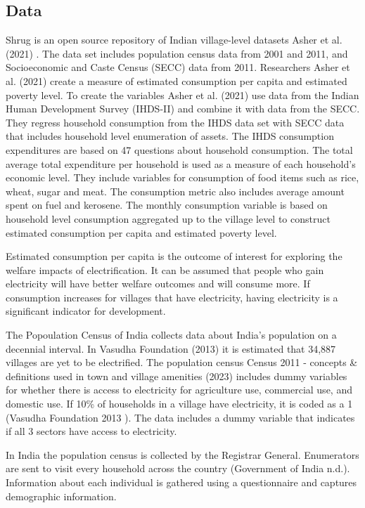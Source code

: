 \documentclass[
]{article}
\begin{document}
\hypertarget{data}{%
\subsection{Data}\label{data}}

Shrug is an open source repository of Indian village-level datasets
Asher et al. (2021) . The data set includes population census data from
2001 and 2011, and Socioeconomic and Caste Census (SECC) data from 2011.
Researchers Asher et al. (2021) create a measure of estimated
consumption per capita and estimated poverty level. To create the
variables Asher et al. (2021) use data from the Indian Human Development
Survey (IHDS-II) and combine it with data from the SECC. They regress
household consumption from the IHDS data set with SECC data that
includes household level enumeration of assets. The IHDS consumption
expenditures are based on 47 questions about household consumption. The
total average total expenditure per household is used as a measure of
each household's economic level. They include variables for consumption
of food items such as rice, wheat, sugar and meat. The consumption
metric also includes average amount spent on fuel and kerosene. The
monthly consumption variable is based on household level consumption
aggregated up to the village level to construct estimated consumption
per capita and estimated poverty level.

Estimated consumption per capita is the outcome of interest for
exploring the welfare impacts of electrification. It can be assumed that
people who gain electricity will have better welfare outcomes and will
consume more. If consumption increases for villages that have
electricity, having electricity is a significant indicator for
development.

The Popoulation Census of India collects data about India's population
on a decennial interval. In Vasudha Foundation (2013) it is estimated
that 34,887 villages are yet to be electrified. The population census
Census 2011 - concepts \& definitions used in town and village amenities
(2023) includes dummy variables for whether there is access to
electricity for agriculture use, commercial use, and domestic use. If
10\% of households in a village have electricity, it is coded as a 1
(Vasudha Foundation 2013 ). The data includes a dummy variable that
indicates if all 3 sectors have access to electricity.

In India the population census is collected by the Registrar General.
Enumerators are sent to visit every household across the country
(Government of India n.d.). Information about each individual is
gathered using a questionnaire and captures demographic information.
\end{document}

